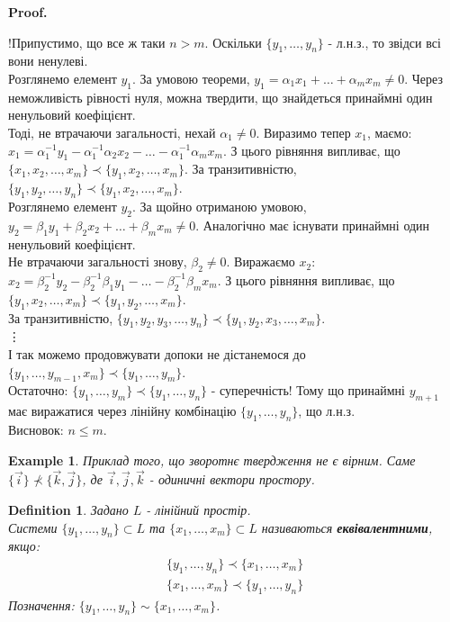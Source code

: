 \documentclass[a4paper, 10pt]{article}
\makeatletter
\theoremstyle{theoremdd}
\newtheorem{definition}[theorem]{Definition}
\newtheorem{example}[theorem]{Example}
\renewenvironment{proof}[1][Proof.\\]{\par
\pushQED{\hfill \qed}%
\normalfont \topsep6\p@\@plus6\p@\relax
\trivlist
\item\relax
{\bfseries
#1\@addpunct{.}}\hspace\labelsep\ignorespaces
}{%
\popQED\endtrivlist\@endpefalse
}
\makeatother
\begin{document}
	\begin{proof}
	!Припустимо, що все ж таки $n > m$. Оскільки $\{y_1,\dots,y_n\}$ - л.н.з., то звідси всі вони ненулеві.\\
Розглянемо елемент $y_1$. За умовою теореми, $y_1 = \alpha_1 x_1 + \dots + \alpha_m x_m \neq 0$. Через неможливість рівності нуля, можна твердити, що знайдеться принаймні один ненульовий коефіцієнт.\\
Тоді, не втрачаючи загальності, нехай $\alpha_1 \neq 0$. Виразимо тепер $x_1$, маємо:\\
$x_1 = \alpha_1^{-1}y_1 - \alpha_1^{-1}\alpha_2 x_2 - \dots - \alpha_1^{-1} \alpha_m x_m$. З цього рівняння випливає, що $\{x_1, x_2, \dots,x_m\} \prec \{y_1, x_2, \dots,x_m\}$. За транзитивністю, $\{y_1,y_2,\dots,y_n \} \prec \{y_1,x_2,\dots,x_m \}$.\\
Розглянемо елемент $y_2$. За щойно отриманою умовою, $y_2 = \beta_1 y_1 + \beta_2 x_2 + \dots + \beta_m x_m \neq 0$. Аналогічно має існувати принаймні один ненульовий коефіцієнт. \\
Не втрачаючи загальності знову, $\beta_2 \neq 0$. Виражаємо $x_2$:\\
$x_2 = \beta_2^{-1}y_2 - \beta_2^{-1}\beta_1 y_1 - \dots - \beta_2^{-1} \beta_m x_m$. З цього рівняння випливає, що $\{y_1,x_2,\dots,x_m\} \prec \{y_1,y_2,\dots,x_m\}$.\\
За транзитивністю, $\{y_1,y_2,y_3,\dots,y_n\} \prec \{y_1,y_2,x_3,\dots,x_m\}$.\\
\vdots \\
І так можемо продовжувати допоки не дістанемося до $\{y_1,\dots, y_{m-1}, x_m\} \prec \{y_1,\dots,y_m\}$.\\
Остаточно: $\{y_1,\dots,y_m\} \prec \{y_1,\dots,y_n\}$ - суперечність! Тому що принаймні $y_{m+1}$ має виражатися через лінійну комбінацію $\{y_1,\dots,y_n\}$, що л.н.з.\\
Висновок: $n \leq m$.	
	\end{proof}
	
	\begin{example}
	Приклад того, що зворотнє твердження не є вірним. Саме
	$\{\vec{i}\} \not\prec \{\vec{k}, \vec{j}\}$, де $\vec{i},\vec{j},\vec{k}$ - одиничні вектори простору.
	\end{example}
	
	\begin{definition}
	Задано $L$ - лінійний простір.\\
	Системи $\{y_1, \dots, y_n \} \subset L$ та $\{x_1, \dots, x_m \} \subset L$ називаються \textbf{еквівалентними}, якщо:
	\begin{align*}
	\{y_1, \dots, y_n \} \prec \{x_1, \dots, x_m \} \\
	\{x_1, \dots, x_m \} \prec \{y_1, \dots, y_n \}
	\end{align*}
	Позначення: $\{y_1, \dots, y_n \} \sim \{x_1, \dots, x_m \}$.
	\end{definition}
	
\end{document}
